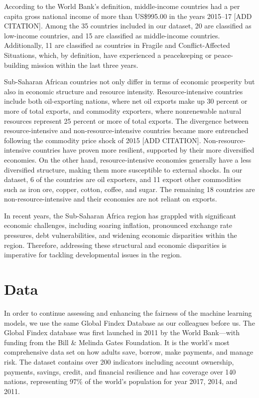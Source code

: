 \documentclass[12pt]{article}
\begin{document}
According to the World Bank's definition, middle-income countries had a
per capita gross national income of more than US\$995.00 in the years
2015--17 {[}ADD CITATION{]}. Among the 35 countries included in our
dataset, 20 are classified as low-income countries, and 15 are
classified as middle-income countries. Additionally, 11 are classified
as countries in Fragile and Conflict-Affected Situations, which, by
definition, have experienced a peacekeeping or peace-building mission
within the last three years.

Sub-Saharan African countries not only differ in terms of economic
prosperity but also in economic structure and resource intensity.
Resource-intensive countries include both oil-exporting nations, where
net oil exports make up 30 percent or more of total exports, and
commodity exporters, where nonrenewable natural resources represent 25
percent or more of total exports. The divergence between
resource-intensive and non-resource-intensive countries became more
entrenched following the commodity price shock of 2015 {[}ADD
CITATION{]}. Non-resource-intensive countries have proven more
resilient, supported by their more diversified economies. On the other
hand, resource-intensive economies generally have a less diversified
structure, making them more susceptible to external shocks. In our
dataset, 6 of the countries are oil exporters, and 11 export other
commodities such as iron ore, copper, cotton, coffee, and sugar. The
remaining 18 countries are non-resource-intensive and their economies
are not reliant on exports.

In recent years, the Sub-Saharan Africa region has grappled with
significant economic challenges, including soaring inflation, pronounced
exchange rate pressures, debt vulnerabilities, and widening economic
disparities within the region. Therefore, addressing these structural
and economic disparities is imperative for tackling developmental issues
in the region.

\hypertarget{data}{%
\section{Data}\label{data}}

In order to continue assessing and enhancing the fairness of the machine
learning models, we use the same Global Findex Database as our
colleagues before us. The Global Findex database was first launched in
2011 by the World Bank---with funding from the Bill \& Melinda Gates
Foundation. It is the world's most comprehensive data set on how adults
save, borrow, make payments, and manage risk. The dataset contains over
200 indicators including account ownership, payments, savings, credit,
and financial resilience and has coverage over 140 nations, representing
97\% of the world's population for year 2017, 2014, and 2011.
\end{document}
